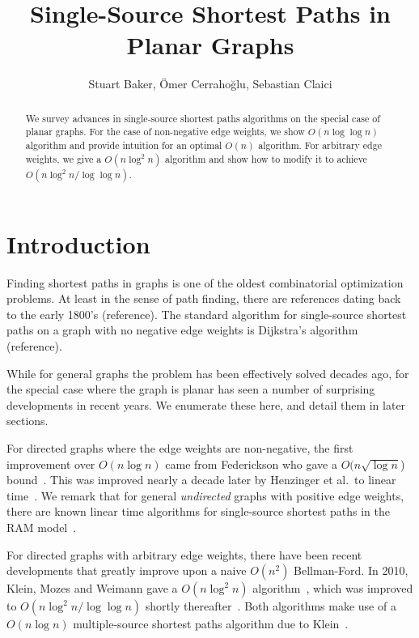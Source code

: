 \documentclass[12pt]{article}
\title{Single-Source Shortest Paths in Planar Graphs}
\author{Stuart Baker, \"{O}mer Cerraho\u{g}lu, Sebastian Claici}
\date{}
\begin{document}
\maketitle

\begin{abstract}
  We survey advances in single-source shortest paths algorithms on the special case of planar graphs. For the case of non-negative edge weights, we show $O(n\log \log n)$ algorithm and provide intuition for an optimal $O(n)$ algorithm. For arbitrary edge weights, we give a $O(n\log^2 n)$ algorithm and show how to modify it to achieve $O(n\log^2 n/\log \log n)$.
\end{abstract}

\section{Introduction}
\label{sec:introduction}

Finding shortest paths in graphs is one of the oldest combinatorial optimization problems. At least in the sense of path finding, there are references dating back to the early 1800's (reference). The standard algorithm for single-source shortest paths on a graph with no negative edge weights is Dijkstra's algorithm (reference).

While for general graphs the problem has been effectively solved decades ago, for the special case where the graph is planar has seen a number of surprising developments in recent years. We enumerate these here, and detail them in later sections.

For directed graphs where the edge weights are non-negative, the first improvement over $O(n\log n)$ came from Federickson who gave a $O(n \sqrt{\log n}$) bound~\cite{federickson1987fast}. This was improved nearly a decade later by Henzinger et al.\ to linear time~\cite{henzinger1997faster}. We remark that for general \emph{undirected} graphs with positive edge weights, there are known linear time algorithms for single-source shortest paths in the RAM model~\cite{thorup1999undirected}.

For directed graphs with arbitrary edge weights, there have been recent developments that greatly improve upon a naive $O(n^2)$ Bellman-Ford. In 2010, Klein, Mozes and Weimann gave a $O(n \log^2 n)$ algorithm~\cite{klein2010shortest}, which was improved to $O(n \log^2 n / \log \log n)$ shortly thereafter~\cite{mozes2010shortest}. Both algorithms make use of a $O(n \log n)$ multiple-source shortest paths algorithm due to Klein~\cite{klein2005multiple}.
\end{document}
